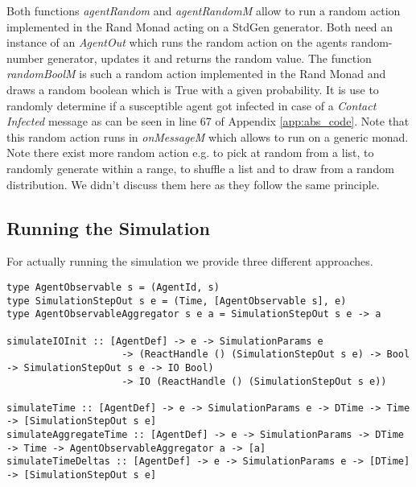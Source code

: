 Both functions \textit{agentRandom} and \textit{agentRandomM} allow to run a random action implemented in the Rand Monad acting on a StdGen generator. Both need an instance of an \textit{AgentOut} which runs the random action on the agents random-number generator, updates it and returns the random value.
The function \textit{randomBoolM} is such a random action implemented in the Rand Monad and draws a random boolean which is True with a given probability. It is use to randomly determine if a susceptible agent got infected in case of a \textit{Contact Infected} message as can be seen in line 67 of Appendix \ref{app:abs_code}. Note that this random action runs in \textit{onMessageM} which allows to run on a generic monad. Note there exist more random action e.g. to pick at random from a list, to randomly generate within a range, to shuffle a list and to draw from a random distribution. We didn't discuss them here as they follow the same principle.

\subsection{Running the Simulation}
For actually running the simulation we provide three different approaches. 

\begin{verbatim}
type AgentObservable s = (AgentId, s)
type SimulationStepOut s e = (Time, [AgentObservable s], e)
type AgentObservableAggregator s e a = SimulationStepOut s e -> a

simulateIOInit :: [AgentDef] -> e -> SimulationParams e
                    -> (ReactHandle () (SimulationStepOut s e) -> Bool -> SimulationStepOut s e -> IO Bool)
                    -> IO (ReactHandle () (SimulationStepOut s e))
                    
simulateTime :: [AgentDef] -> e -> SimulationParams e -> DTime -> Time -> [SimulationStepOut s e]
simulateAggregateTime :: [AgentDef] -> e -> SimulationParams -> DTime -> Time -> AgentObservableAggregator a -> [a]
simulateTimeDeltas :: [AgentDef] -> e -> SimulationParams e -> [DTime] -> [SimulationStepOut s e]
\end{verbatim}

